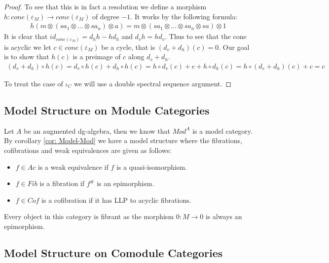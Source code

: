 \documentclass[../thesis.tex]{subfiles}
\begin{document}
\begin{proof}
                To see that this is in fact a resolution we define a morphism $h : cone(\varepsilon_M) \rightarrow cone(\varepsilon_M)$ of degree $-1$. It works by the following formula:
                \begin{align*}
                    h(m \otimes (sa_1 \otimes ... \otimes sa_n) \otimes a) = m \otimes (sa_1 \otimes ... \otimes sa_n \otimes sa) \otimes 1
                \end{align*}
                It is clear that $id_{cone(\varepsilon_M)} = d_hh - hd_h$ and $d_vh = hd_v$. Thus to see that the cone is acyclic we let $c\in cone(\varepsilon_M)$ be a cycle, that is $(d_v + d_h)(c) = 0$. Our goal is to show that $h(c)$ is a preimage of $c$ along $d_v + d_h$.
                \begin{multline*}
                    (d_v + d_h)\circ h(c) = d_v\circ h(c) + d_h\circ h(c) = h\circ d_v(c) + c + h\circ d_h(c) = h\circ (d_v + d_h)(c) + c = c
                \end{multline*}

                To treat the case of $\iota_C$ we will use a double spectral sequence argument. 

            \end{proof}

        \subsection{Model Structure on Module Categories}

            Let $A$ be an augmented dg-algebra, then we know that $Mod^A$ is a model category. By corollary \ref{cor: Model-Mod} we have a model structure where the fibrations, cofibrations and weak equivalences are given as follows:
            \begin{itemize}
                \item $f\in Ac$ is a weak equivalence if $f$ is a quasi-isomorphism.
                \item $f\in Fib$ is a fibration if $f^\#$ is an epimorphism.
                \item $f\in Cof$ is a cofibration if it has LLP to acyclic fibrations. 
            \end{itemize}

            Every object in this category is fibrant as the morphism $0 : M \rightarrow 0$ is always an epimorphism.

        \subsection{Model Structure on Comodule Categories}
\end{document}
